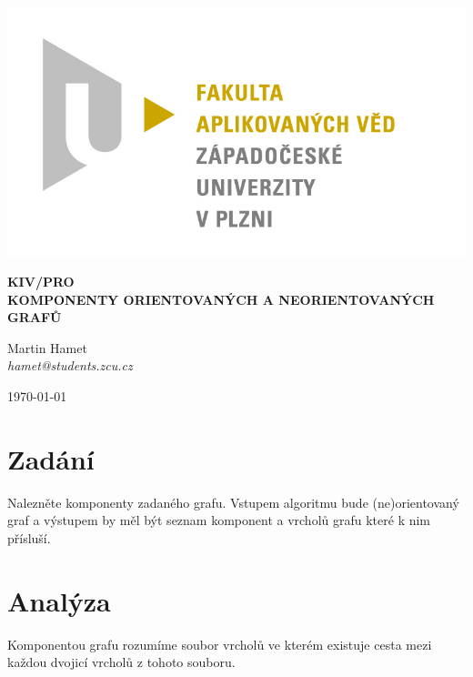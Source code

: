 \documentclass[12pt]{article}
\begin{document}
\begin{titlepage}
\includegraphics[scale=0.2, trim=5cm 0 0 30cm]{logo.jpg}
\begin{center}
\vspace{5cm}
{\Huge
\textbf{KIV/PRO}\\
\vspace{1cm}
}
{\Large
\textbf{KOMPONENTY ORIENTOVANÝCH A NEORIENTOVANÝCH GRAFŮ}
}
\end{center}
\vspace{\fill}

\begin{minipage}[t]{5cm}
\flushleft
Martin Hamet\\
\textit{
hamet@students.zcu.cz
}
\end{minipage}
\hfill
\begin{minipage}[t]{7cm}
\flushright
\today
\end{minipage}
\end{titlepage}

\tableofcontents
\newpage
\section{Zadání}
Nalezněte komponenty zadaného grafu. Vstupem algoritmu bude (ne)orientovaný graf a výstupem by měl být seznam komponent a vrcholů grafu které k nim přísluší.

\section{Analýza}
\label{Analysis}
Komponentou grafu rozumíme soubor vrcholů ve kterém existuje cesta mezi každou dvojicí vrcholů z tohoto souboru.
\end{document}

